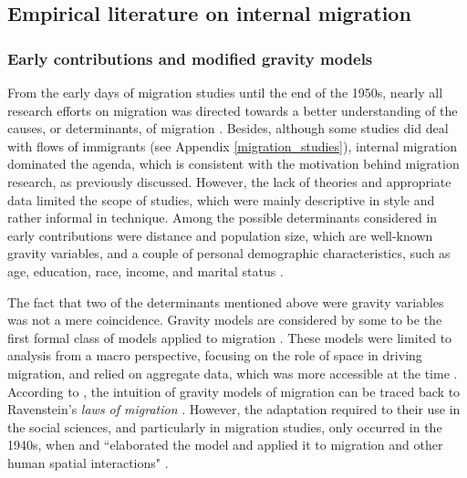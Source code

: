 \subsection{Empirical literature on internal migration} \label{lit_review_empirical_internal}

\subsubsection{Early contributions and modified gravity models}

From the early days of migration studies until the end of the 1950s, nearly all research efforts on migration was directed towards a better understanding of the causes, or determinants, of migration \citep{sjaastad_costs_1962, greenwood_research_1975, greenwood_early_2003}. Besides, although some studies did deal with flows of immigrants (see Appendix \ref{migration_studies}), internal migration dominated the agenda, which is consistent with the motivation behind migration research, as previously discussed. However, the lack of theories and appropriate data limited the scope of studies, which were mainly descriptive in style and rather informal in technique. Among the possible determinants considered in early contributions were distance and population size, which are well-known gravity variables, and a couple of personal demographic characteristics, such as age, education, race, income, and marital status \citep{greenwood_internal_1997}.

The fact that two of the determinants mentioned above were gravity variables was not a mere coincidence. Gravity models are considered by some to be the first formal class of models applied to migration \citep{greenwood_early_2003, cushing_crossing_2004}. These models were limited to analysis from a macro perspective, focusing on the role of space in driving migration, and relied on aggregate data, which was more accessible at the time \citep{greenwood_research_1975, greenwood_internal_1997, greenwood_early_2003, cushing_crossing_2004}. According to \cite{greenwood_early_2003}, the intuition of gravity models of migration can be traced back to Ravenstein's \textit{laws of migration} \citep{ravenstein_laws_1885, ravenstein_laws_1889}. However, the adaptation required to their use in the social sciences, and particularly in migration studies, only occurred in the 1940s, when \cite{zipf_unity_1942, zipf_p1_1946} and \cite{stewart_empirical_1947} ``elaborated the model and applied it to migration and other human spatial interactions" \citep[p. 26]{greenwood_early_2003}.

